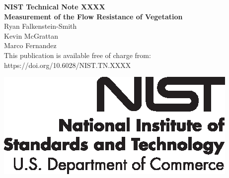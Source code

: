 \documentclass[12pt]{article}
\newcommand{\pubnumber}{XXXX}
\newcommand{\DOI}{https://doi.org/10.6028/NIST.TN.XXXX}
\begin{document}
\pagestyle{empty}
	
	\begin{titlepage}
		\begin{flushright}
\LARGE{\textbf{NIST Technical Note \pubnumber}}\\
\vfill
\Huge{\textbf{Measurement of the Flow Resistance of Vegetation}}\\
\vfill
\large Ryan Falkenstein-Smith\\
\large Kevin McGrattan\\
\large Marco Fernandez \\
\vfill
\normalsize This publication is available free of charge from:\\
\DOI\\
\vfill

\includegraphics[width=0.3\linewidth]{NIST-logo.eps}\\


\end{flushright}
\end{titlepage}
\end{document}
